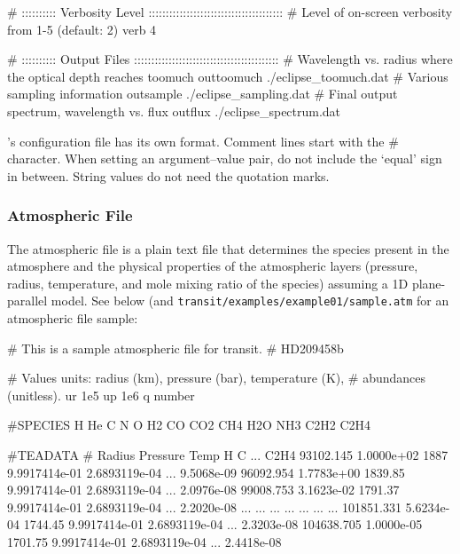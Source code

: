 \documentclass[letterpaper, 12pt]{article}
\begin{document}
\begin{plain}
# ::::::::::  Verbosity Level  :::::::::::::::::::::::::::::::::::::::
# Level of on-screen verbosity from 1-5 (default: 2)
verb 4

# ::::::::::  Output Files  ::::::::::::::::::::::::::::::::::::::::::
# Wavelength vs. radius where the optical depth reaches toomuch
outtoomuch ./eclipse_toomuch.dat
# Various sampling information
outsample  ./eclipse_sampling.dat
# Final output spectrum, wavelength vs. flux
outflux    ./eclipse_spectrum.dat
\end{plain}

{\transit}'s configuration file has its own format.  Comment lines
start with the {\tttm \#} character.  When setting an argument--value
pair, do not include the `equal' sign in between.  String values do
not need the quotation marks.

\subsubsection{Atmospheric File}
\label{atm-file}

The atmospheric file is a plain text file that determines the species
present in the atmosphere and the physical properties of the
atmospheric layers (pressure, radius, temperature, and mole mixing
ratio of the species) assuming a 1D plane-parallel model.  See below
(and {\tt transit/examples/example01/sample.atm}  for an atmospheric file sample: \newline

\begin{plain}
# This is a sample atmospheric file for transit.
# HD209458b

# Values units: radius (km), pressure (bar), temperature (K),
#               abundances (unitless).
ur 1e5
up 1e6
q number

#SPECIES
H He C N O H2 CO CO2 CH4 H2O NH3 C2H2 C2H4

#TEADATA
# Radius    Pressure    Temp     H              C              ...  C2H4
 93102.145  1.0000e+02  1887     9.9917414e-01  2.6893119e-04  ...  9.5068e-09
 96092.954  1.7783e+00  1839.85  9.9917414e-01  2.6893119e-04  ...  2.0976e-08
 99008.753  3.1623e-02  1791.37  9.9917414e-01  2.6893119e-04  ...  2.2020e-08
       ...  ...         ...      ...            ...            ...  ...     
101851.331  5.6234e-04  1744.45  9.9917414e-01  2.6893119e-04  ...  2.3203e-08
104638.705  1.0000e-05  1701.75  9.9917414e-01  2.6893119e-04  ...  2.4418e-08
\end{plain}
\end{document}
